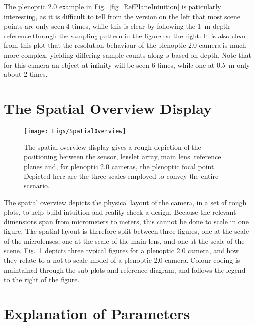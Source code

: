 \documentclass[onecolumn]{article}
\begin{document}
The plenoptic 2.0 example in Fig.~\ref{fig_RefPlaneIntuition} is paticularly interesting, as it is difficult to tell from the version on the left that most scene points are only seen 4 times, while this is clear by following the 1~m depth reference through the sampling pattern in the figure on the right.  It is also clear from this plot that the resolution behaviour of the plenoptic 2.0 camera is much more complex, yielding differing sample counts along $s$ based on depth.  Note that for this camera an object at infinity will be seen 6 times, while one at 0.5~m only about 2 times.

\section{The Spatial Overview Display}

\begin{figure}
	\centering
	\texttt{[image: Figs/SpatialOverview]}
	\caption{The spatial overview display gives a rough depiction of the positioning between the sensor, lenslet array, main lens, reference planes and, for plenoptic 2.0 cameras, the plenoptic focal point. Depicted here are the three scales employed to convey the entire scenario.}
	\label{fig_SpatialOverview}
\end{figure}

The spatial overview depicts the physical layout of the camera, in a set of rough plots, to help build intuition and reality check a design.  Because the relevant dimensions span from micrometers to meters, this cannot be done to scale in one figure.  The spatial layout is therefore split between three figures, one at the scale of the microlenses, one at the scale of the main lens, and one at the scale of the scene.  Fig.~\ref{fig_SpatialOverview} depicts three typical figures for a plenoptic 2.0 camera, and how they relate to a not-to-scale model of a plenoptic 2.0 camera. Colour coding is maintained through the sub-plots and reference diagram, and follows the legend to the right of the figure.

\section{Explanation of Parameters}
\end{document}
